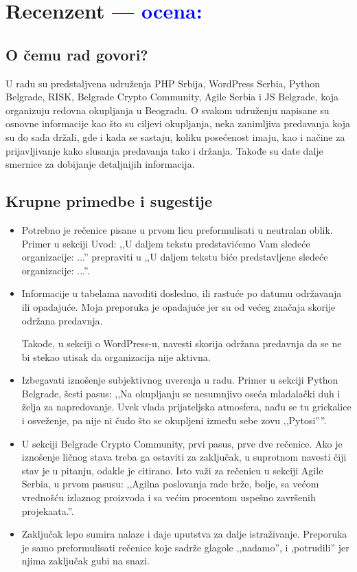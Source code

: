 \documentclass[a4paper]{report}
\newcommand{\odgovor}[1]{\textcolor{blue}{#1}}
\begin{document}
\chapter{Recenzent \odgovor{--- ocena:} }


\section{O čemu rad govori?}
U radu su predstaljvena udruženja PHP Srbija, WordPress Serbia, Python Belgrade, RISK, Belgrade Crypto Community, Agile Serbia i JS Belgrade, koja organizuju redovna okupljanja u Beogradu. O svakom udruženju napisane su osnovne informacije kao što su ciljevi okupljanja, neka zanimljiva predavanja koja su do sada držali, gde i kada se sastaju, koliku posećenost imaju, kao i načine za prijavljivanje kako slusanja predavanja tako i držanja. Takođe su date dalje smernice za dobijanje detaljnijih informacija.
\section{Krupne primedbe i sugestije}
\begin{itemize}
    \item Potrebno je rečenice pisane u prvom licu  preformulisati u neutralan oblik. 
    Primer u sekciji Uvod: ,,U daljem tekstu predstavićemo Vam sledeće organizacije: ...'' prepraviti u ,,U daljem tekstu biće predstavljene sledeće organizacije: ...''.
    \item Informacije u tabelama navoditi dosledno, ili rastuće po datumu održavanja ili opadajuće. Moja preporuka je opadajuće jer su od većeg značaja skorije održana predavnja.
    
    Takođe, u sekciji o WordPress-u, navesti skorija održana predavnja da se ne bi stekao utisak da organizacija nije aktivna.
    \item Izbegavati iznošenje subjektivnog uverenja u radu.
    Primer u sekciji Python Belgrade, šesti pasus: ,,Na okupljanju se nesumnjivo oseća mladalački duh i želja za napredovanje. Uvek vlada prijateljska atmosfera, nađu se tu grickalice i osveženje, pa nije ni čudo što se okupljeni između sebe zovu ,,Pytosi''''.
    \item U sekciji Belgrade Crypto Community, prvi pasus, prve dve rečenice. Ako je iznošenje ličnog stava treba ga ostaviti za zaključak, u suprotnom navesti čiji stav je u pitanju, odakle je citirano. Isto važi za rečenicu u sekciji Agile Serbia, u prvom pasusu: ,,Agilna poslovanja rade brže, bolje, sa većom vrednošću izlaznog proizvoda i sa većim procentom uspešno završenih projekaata.''. 
    \item Zaključak lepo sumira nalaze i daje uputstva za dalje istraživanje. Preporuka je samo preformulisati rečenice koje sadrže glagole ,,nadamo'', i ,potrudili'' jer njima zaključak gubi na snazi.
\end{itemize}{}
\end{document}
